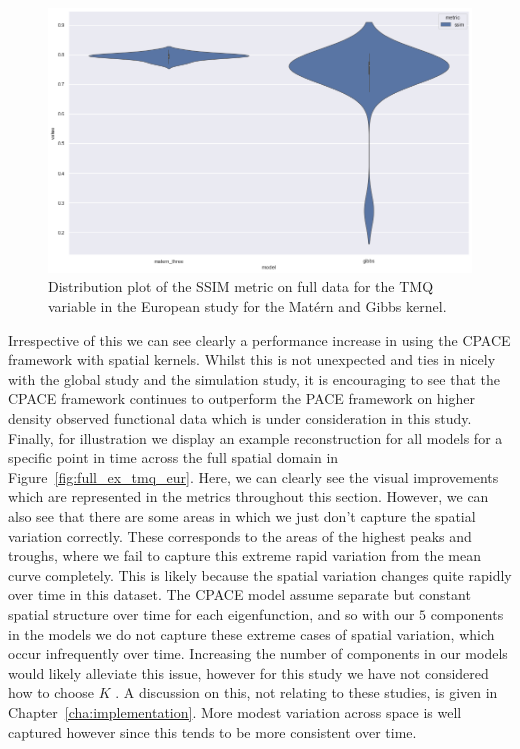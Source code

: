 \begin{figure}
	\centering
	\includegraphics[width=\textwidth]{full_tmq_eur_dist}
	\caption{Distribution plot of the SSIM metric on full data for the TMQ variable in the European study for the Mat\'ern and Gibbs kernel.}
	\label{fig:full_tmq_eur_dist}
\end{figure}

Irrespective of this we can see clearly a performance increase in using the CPACE framework with spatial kernels.
Whilst this is not unexpected and ties in nicely with the global study and the simulation study, it is encouraging to see that the CPACE framework continues to outperform the PACE framework on  higher density observed functional data which is under consideration in this study.
Finally, for illustration we display an example reconstruction for all models for a specific point in time across the full spatial domain in Figure~\ref{fig:full_ex_tmq_eur}.
Here, we can clearly see the visual  improvements which are represented in the metrics throughout this section.
However, we can also see that there are some areas in which we just don't capture the spatial variation correctly.
These corresponds to the areas of the highest peaks  and troughs, where we fail to capture this extreme rapid variation from the mean curve completely.
This is likely because the spatial variation changes quite rapidly over time in this dataset.
The CPACE model assume separate but constant spatial structure over time for each eigenfunction, and so with our $5$ components in the models we do not capture these extreme cases of spatial variation, which occur infrequently over time.
Increasing the number of components in our models would likely alleviate this issue, however for this study we have not considered how to choose $K$ .
A discussion on this, not relating to these studies, is given in Chapter~\ref{cha:implementation}.
More modest variation across space is well captured however since this tends to be more consistent over time.

